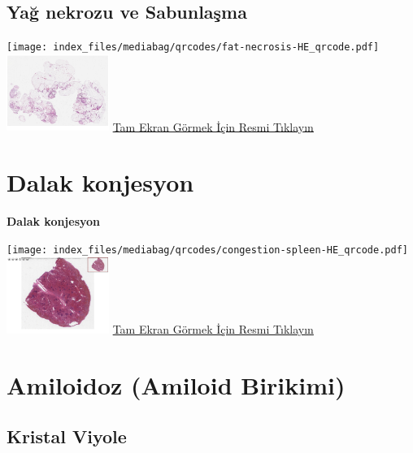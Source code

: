 \documentclass[
  letterpaper,
  DIV=11,
  numbers=noendperiod]{scrreprt}
\begin{document}
\hypertarget{sec-yag-nekrozu-sabunlasma}{%
\section{Yağ nekrozu ve Sabunlaşma}\label{sec-yag-nekrozu-sabunlasma}}

\texttt{[image: index\_files/mediabag/qrcodes/fat-necrosis-HE\_qrcode.pdf]}
\href{https://images.patolojiatlasi.com/fat-necrosis/HE.html}{\includegraphics[width=0.25\textwidth,height=\textheight]{./screenshots/thumbnail_fat-necrosis.png}}
\href{https://images.patolojiatlasi.com/fat-necrosis/HE.html}{Tam Ekran
Görmek İçin Resmi Tıklayın}

\hypertarget{sec-congestion-spleen}{%
\chapter{Dalak konjesyon}\label{sec-congestion-spleen}}

\textbf{Dalak konjesyon}

\texttt{[image: index\_files/mediabag/qrcodes/congestion-spleen-HE\_qrcode.pdf]}
\href{https://images.patolojiatlasi.com/congestion-spleen/HE.html}{\includegraphics[width=0.25\textwidth,height=\textheight]{./screenshots/thumbnail_congestion-spleen.png}}
\href{https://images.patolojiatlasi.com/congestion-spleen/HE.html}{Tam
Ekran Görmek İçin Resmi Tıklayın}

\hypertarget{sec-amiloidoz}{%
\chapter{Amiloidoz (Amiloid Birikimi)}\label{sec-amiloidoz}}

\hypertarget{sec-amiloidoz-kristal-viyole}{%
\section{Kristal Viyole}\label{sec-amiloidoz-kristal-viyole}}
\end{document}
